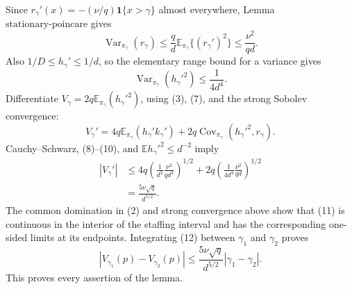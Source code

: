 Since \(r_\gamma'(x)=-(\nu/q)\mathbf1\{x>\gamma\}\) almost everywhere, Lemma \(\mathrm{stationary\mbox{-}poincare}\) gives
\[
 \operatorname{Var}_{\pi_\gamma}(r_\gamma)
 \leq\frac qd\mathbb E_{\pi_\gamma}\{(r_\gamma')^2\}
 \leq\frac{\nu^2}{qd}.                                       \tag{9}
\]
Also \(1/D\leq h_\gamma'\leq1/d\), so the elementary range bound for a variance gives
\[
 \operatorname{Var}_{\pi_\gamma}(h_\gamma'^2)
 \leq\frac1{4d^4}.                                            \tag{10}
\]
Differentiate \(V_\gamma=2q\mathbb E_{\pi_\gamma}(h_\gamma'^2)\), using (3), (7), and the strong Sobolev convergence:
\[
 V_\gamma'
 =4q\mathbb E_{\pi_\gamma}(h_\gamma'k_\gamma')
 +2q\operatorname{Cov}_{\pi_\gamma}(h_\gamma'^2,r_\gamma). \tag{11}
\]
Cauchy--Schwarz, (8)--(10), and \(\mathbb E h_\gamma'^2\leq d^{-2}\) imply
\[
 \begin{split}
 |V_\gamma'|
 &\leq4q\left(\frac1{d^2}\frac{\nu^2}{qd^3}\right)^{1/2}
 +2q\left(\frac1{4d^4}\frac{\nu^2}{qd}\right)^{1/2}\\
 &=\frac{5\nu\sqrt q}{d^{5/2}}.                              \tag{12}
 \end{split}
\]
The common domination in (2) and strong convergence above show that (11) is continuous in the interior of the staffing interval and has the corresponding one-sided limits at its endpoints.  Integrating (12) between \(\gamma_1\) and \(\gamma_2\) proves
\[
 |V_{\gamma_1}(p)-V_{\gamma_2}(p)|
 \leq\frac{5\nu\sqrt q}{d^{5/2}}|\gamma_1-\gamma_2|.
\]
This proves every assertion of the lemma.
